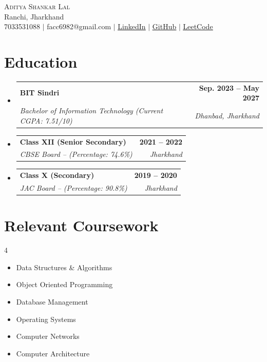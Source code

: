 \documentclass[letterpaper,11pt]{article}
\makeatletter
\newcommand{\resumeSubheading}[4]{
  \vspace{-2pt}\item
    \begin{tabular*}{1.0\textwidth}[t]{l@{\extracolsep{\fill}}r}
      \textbf{#1} & \textbf{\small #2} \\
      \textit{\small#3} & \textit{\small #4} \\
    \end{tabular*}\vspace{-7pt}
}
\newcommand{\resumeSubHeadingListStart}{\begin{itemize}[leftmargin=0.0in, label={}]}
\newcommand{\resumeSubHeadingListEnd}{\end{itemize}}
\makeatother
\begin{document}
\begin{center}
    {\Huge \scshape Aditya Shankar Lal} \\ \vspace{1pt}
    Ranchi, Jharkhand \\ \vspace{1pt}
    \small 7033531088 $|$ facc6982@gmail.com $|$
    \href{https://www.linkedin.com/in/aadi-lal/}{\underline{LinkedIn}} $|$
    \href{https://github.com/aadi17-arch}{\underline{GitHub}} $|$
    \href{https://leetcode.com/aadi17-arch}{\underline{LeetCode}}
    \vspace{-8pt}
\end{center}

\section{Education}
  \resumeSubHeadingListStart
    \resumeSubheading
      {BIT Sindri}{Sep. 2023 -- May 2027}
      {Bachelor of Information Technology (Current CGPA: 7.51/10)}{Dhanbad, Jharkhand}
    \resumeSubheading
      {Class XII (Senior Secondary)}{2021 -- 2022}
      {CBSE Board -- (Percentage: 74.6\%)}{Jharkhand}
    \resumeSubheading
      {Class X (Secondary)}{2019 -- 2020}
      {JAC Board -- (Percentage: 90.8\%)}{Jharkhand}
  \resumeSubHeadingListEnd

\section{Relevant Coursework}
        \begin{multicols}{4}
            \begin{itemize}[itemsep=-5pt, parsep=3pt]
                \item\small Data Structures \& Algorithms
                \item Object Oriented Programming
                \item Database Management
                \item Operating Systems
                \item Computer Networks
                \item Computer Architecture
            \end{itemize}
        \end{multicols}
        \vspace*{2.0\multicolsep}

\end{document}
